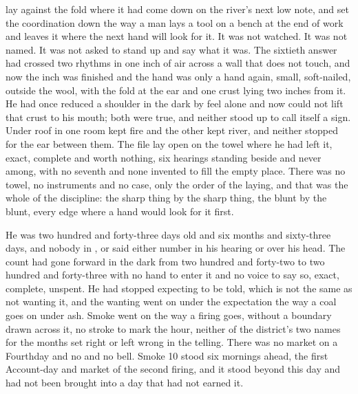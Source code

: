 
 lay against the fold where it had come down on the river's next low note, and  set the coordination down the way a man lays a tool on a bench at the end of work and leaves it where the next hand will look for it. It was not watched. It was not named. It was not asked to stand up and say what it was. The sixtieth answer had crossed two rhythms in one inch of air across a wall that does not touch, and now the inch was finished and the hand was only a hand again, small, soft-nailed, outside the wool, with the fold at the ear and one crust lying two inches from it. He had once reduced a shoulder in the dark by feel alone and now could not lift that crust to his mouth; both were true, and neither stood up to call itself a sign. Under  roof in  one room kept fire and the other kept river, and neither stopped for the ear between them. The file lay open on the towel where he had left it, exact, complete and worth nothing, six hearings standing beside  and never among, with no seventh and none invented to fill the empty place. There was no towel, no instruments and no case, only the order of the laying, and that was the whole of the discipline: the sharp thing by the sharp thing, the blunt by the blunt, every edge where a hand would look for it first.

He was two hundred and forty-three days old and six months and sixty-three days, and nobody in ,  or  said either number in his hearing or over his head. The count had gone forward in the dark from two hundred and forty-two to two hundred and forty-three with no hand to enter it and no voice to say so, exact, complete, unspent. He had stopped expecting to be told, which is not the same as not wanting it, and the wanting went on under the expectation the way a coal goes on under ash. Smoke went on the way a firing goes, without a boundary drawn across it, no stroke to mark the hour, neither of the district's two names for the months set right or left wrong in the telling. There was no market on a Fourthday and no  and no bell. Smoke 10 stood six mornings ahead, the first Account-day and market of the second firing, and it stood beyond this day and had not been brought into a day that had not earned it.

